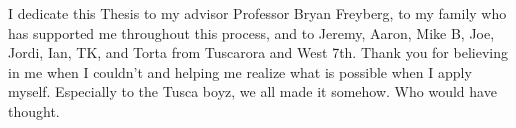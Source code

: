 I dedicate this Thesis to my advisor Professor Bryan Freyberg, to my family who has supported me throughout this process, and to Jeremy, Aaron, Mike B, Joe, Jordi, Ian, TK, and Torta from Tuscarora and West 7th. Thank you for believing in me when I couldn't and helping me realize what is possible when I apply myself. Especially to the Tusca boyz, we all made it somehow. Who would have thought.
